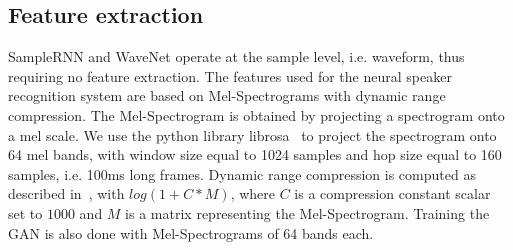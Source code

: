 \subsection{Feature extraction}
SampleRNN and WaveNet operate at the sample level, i.e. waveform, thus requiring
no feature extraction. The features used for the neural speaker recognition
system are based on Mel-Spectrograms with dynamic range compression. The
Mel-Spectrogram is obtained by projecting a spectrogram onto a mel scale. We use
the python library librosa~\cite{mcfee2015librosa} to project the spectrogram
onto 64 mel bands, with window size equal to 1024 samples and hop size equal to
160 samples, i.e. 100ms long frames. Dynamic range compression is computed as
described in~\cite{lukic2016speaker}, with $log(1 + C*M)$, where $C$ is a
compression constant scalar set to $1000$ and $M$ is a matrix representing the
Mel-Spectrogram. Training the GAN is also done with Mel-Spectrograms of 64 bands each.
                        
